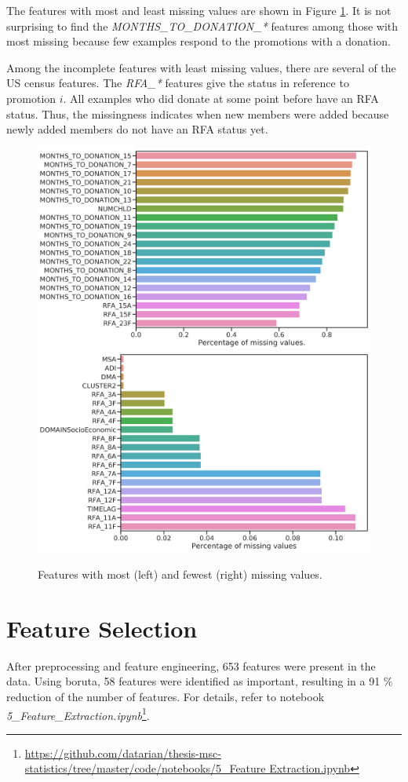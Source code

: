 \documentclass[
  11pt,
  a4paper,
  DIV=12,captions=tableheading,oneside,titlepage]{scrbook}
\begin{document}
The features with most and least missing values are shown in Figure \ref{fig:most-fewest-missing}. It is not surprising to find the \emph{MONTHS\_TO\_DONATION\_*} features among those with most missing because few examples respond to the promotions with a donation.

Among the incomplete features with least missing values, there are several of the US census features. The \emph{RFA\_*} features give the status in reference to promotion \(i\). All examples who did donate at some point before have an RFA status. Thus, the missingness indicates when new members were added because newly added members do not have an RFA status yet.



\begin{figure}

{\centering \includegraphics[width=0.49\linewidth]{figures/imputation/most-missing} \includegraphics[width=0.49\linewidth]{figures/imputation/fewest-missing} 

}

\caption{Features with most (left) and fewest (right) missing values.}\label{fig:most-fewest-missing}
\end{figure}

\hypertarget{feature-selection}{%
\section{Feature Selection}\label{feature-selection}}

After preprocessing and feature engineering, 653 features were present in the data. Using boruta, 58 features were identified as important, resulting in a 91 \% reduction of the number of features. For details, refer to notebook \emph{5\_Feature\_Extraction.ipynb}\footnote{\href{https://github.com/datarian/thesis-msc-statistics/tree/master/code/notebooks/5_Feature\%20Extraction.ipynb}{https://github.com/datarian/thesis-msc-statistics/tree/master/code/notebooks/5\_Feature Extraction.ipynb}}.
\end{document}
